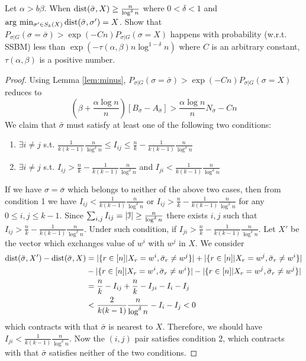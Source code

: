 \documentclass{article}
\begin{document}
\begin{lemma}\label{lem:sigmaX}
		Let $\alpha > b \beta$. When $\operatorname{dist}(\bar{\sigma}, X) \geq \frac{n}{\log^{\delta} n}$ where $0<\delta < 1$ and $\arg\,\min_{\sigma'\in S_k(X)} \operatorname{dist}(\bar{\sigma}, \sigma') = X$. Show that
	$P_{\sigma | G}(\sigma = \bar{\sigma} ) > \exp(-Cn) P_{\sigma | G}(\sigma = X)$
	happens with probability (w.r.t. SSBM) less than $\exp(-\tau(\alpha,\beta) n \log^{1-\delta} n )$ where $C$ is an arbitrary constant, $\tau(\alpha,\beta)$ is a positive number.
\end{lemma}
\begin{proof}
	Using Lemma \ref{lem:minus}, $P_{\sigma | G}(\sigma = \bar{\sigma} ) > \exp(-Cn) P_{\sigma | G}(\sigma = X)$ reduces to
	\begin{equation}\label{eq:BwA}
	(\beta + \frac{\alpha \log n}{n})[B_{\bar{\sigma}} - A_{\bar{\sigma}}] >  \frac{\alpha \log n}{n} N_{\bar{\sigma}}  - Cn
	\end{equation}
	We claim that $\bar{\sigma}$ must satisfy at least one of the following two conditions:
	\begin{enumerate}
		\item $\exists i\neq j$ s.t. $\frac{1}{k(k-1)}\frac{n}{\log^{\delta} n} \leq I_{ij} \leq \frac{n}{k} - \frac{1}{k(k-1)}\frac{n}{\log^{\delta} n}$
		\item $\exists i \neq j$ s.t. $I_{ij} > \frac{n}{k} - \frac{1}{k(k-1)}\frac{n}{\log^{\delta} n}$ and $I_{ji} < \frac{1}{k(k-1)}\frac{n}{\log^{\delta} n}$
	\end{enumerate}
	If we have $\sigma = \bar{\sigma}$ which belongs to neither of the above two cases, then from condition 1 we have
	$I_{ij} < \frac{1}{k(k-1)}\frac{n}{\log^{\delta} n}$ or $I_{ij} > \frac{n}{k} - \frac{1}{k(k-1)}\frac{n}{\log^{\delta} n}$ for any $0 \leq i,j\leq k-1$.
	Since $\sum_{i,j} I_{ij} = |\mathcal{I}| \geq \frac{n}{\log^{\delta} n}$ there exists $i,j$ such that $I_{ij} > \frac{n}{k} - \frac{1}{k(k-1)}\frac{n}{\log^{\delta} n}$.
	Under such condition, if $I_{ji} > \frac{n}{k} - \frac{1}{k(k-1)}\frac{n}{\log^{\delta} n}$.
	Let $X'$ be the vector which exchanges value of $w^i$ with $w^j$ in $X$. We consider
	\begin{align*}
	\operatorname{dist}(\bar{\sigma}, X') - \operatorname{dist}(\bar{\sigma}, X) &= |\{ r \in [n]|X_r=w^i, \bar{\sigma}_r \neq w^j \}| + |\{ r \in [n]|X_r=w^j, \bar{\sigma}_r \neq w^i \}| \\
	&-|\{ r \in [n]|X_r=w^i, \bar{\sigma}_r \neq w^i \}| - |\{ r \in [n]|X_r=w^j, \bar{\sigma}_r \neq w^j \}| \\
	& = \frac{n}{k} - I_{ij} +  \frac{n}{k} - I_{ji} - I_i - I_j \\
	& < \frac{2}{k(k-1)}\frac{n}{\log^{\delta} n} - I_i - I_j < 0
	\end{align*}
	which contracts with that $\bar{\sigma}$ is nearest to $X$.
	Therefore, we should have $I_{ji} < \frac{1}{k(k-1)}\frac{n}{\log^{\delta} n}$.
	Now the $(i, j)$ pair satisfies condition 2, which contracts with that $\bar{\sigma}$ satisfies neither of the two conditions.
	

\end{proof}
\end{document}
